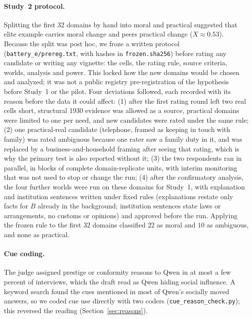 \documentclass[11pt]{article}
\begin{document}
\paragraph{Study~2 protocol.}
Splitting the first $32$ domains by hand into moral and practical suggested that elite example carries moral change and peers practical change ($X\approx0.53$).
Because the split was post hoc, we froze a written protocol (\texttt{battery\_e/prereg.txt}, with hashes in \texttt{frozen.sha256}) before rating any candidate or writing any vignette: the cells, the rating rule, source criteria, worlds, analysis and power.
This locked how the new domains would be chosen and analyzed; it was not a public registry pre-registration of the hypothesis before Study~1 or the pilot.
Four deviations followed, each recorded with its reason before the data it could affect:
(1) after the first rating round left two real cells short, structural 1930 evidence was allowed as a source, practical domains were limited to one per need, and new candidates were rated under the same rule;
(2) one practical-real candidate (telephone, framed as keeping in touch with family) was rated ambiguous because one rater saw a family duty in it, and was replaced by a business-and-household framing after seeing that rating, which is why the primary test is also reported without it;
(3) the two respondents ran in parallel, in blocks of complete domain-replicate units, with interim monitoring that was not used to stop or change the run;
(4) after the confirmatory analysis, the four further worlds were run on these domains for Study~1, with explanation and institution sentences written under fixed rules (explanations restate only facts for $B$ already in the background; institution sentences state laws or arrangements, no customs or opinions) and approved before the run.
Applying the frozen rule to the first $32$ domains classified $22$ as moral and $10$ as ambiguous, and none as practical.

\paragraph{Cue coding.}
The judge assigned prestige or conformity reasons to Qwen in at most a few percent of interviews, which the draft read as Qwen hiding social influence.
A keyword search found the cues mentioned in most of Qwen's socially moved answers, so we coded cue use directly with two coders (\texttt{cue\_reason\_check.py}); this reversed the reading (Section~\ref{sec:reasons}).
\end{document}
